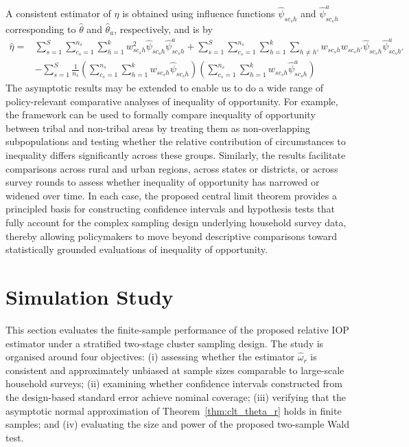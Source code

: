 \documentclass[12pt]{article}
\theoremstyle{plain}
\theoremstyle{definition}
\begin{document}
A consistent estimator of $\eta$ is obtained using influence functions $\hat{\psi}_{sc_sh}$ and $\hat{\psi}^a_{sc_sh}$ corresponding to $\hat{\theta}$ and $\hat{\theta}_a$, respectively, and is by
\begin{align*}
\hat{\eta}=&
\sum_{s=1}^{S}\sum_{c_s=1}^{n_s}\sum_{h=1}^{k}w^2_{sc_sh}\hat{\psi}_{sc_sh}\hat{\psi}_{sc_sh}^a + 
\sum_{s=1}^{S}\sum_{c_s=1}^{n_s}\sum_{h=1}^{k}\sum_{h\neq h'}w_{sc_sh}w_{sc_sh'}\hat{\psi}_{sc_sh}\hat{\psi}_{sc_sh'}^a \\
&-\sum_{s=1}^{S}\frac{1}{n_s}\left(\sum_{c_s=1}^{n_s}\sum_{h=1}^{k}w_{sc_sh}\hat{\psi}_{sc_sh}\right)\left(\sum_{c_s=1}^{n_s}\sum_{h=1}^{k}w_{sc_sh}\hat{\psi}_{sc_sh}^a\right)
\end{align*}
The asymptotic results may be extended to enable us to do a wide range of policy-relevant comparative analyses of inequality of opportunity. For example, the framework can be used to formally compare inequality of opportunity between tribal and non-tribal areas by treating them as non-overlapping subpopulations and testing whether the relative contribution of circumstances to inequality differs significantly across these groups. Similarly, the results facilitate comparisons across rural and urban regions, across states or districts, or across survey rounds to assess whether inequality of opportunity has narrowed or widened over time. In each case, the proposed central limit theorem provides a principled basis for constructing confidence intervals and hypothesis tests that fully account for the complex sampling design underlying household survey data, thereby allowing policymakers to move beyond descriptive comparisons toward statistically grounded evaluations of inequality of opportunity.

\section{Simulation Study}
\label{sec:simulation}


This section evaluates the finite-sample performance of the proposed
relative IOP estimator under a stratified two-stage cluster sampling design.
The study is organised around four objectives: (i) assessing whether the
estimator $\hat{\omega}_r$ is consistent and approximately unbiased at
sample sizes comparable to large-scale household surveys; (ii) examining
whether confidence intervals constructed from the design-based standard
error achieve nominal coverage; (iii) verifying that the asymptotic normal
approximation of Theorem~\ref{thm:clt_theta_r} holds in finite samples; and (iv)
evaluating the size and power of the proposed two-sample Wald test.
\end{document}

